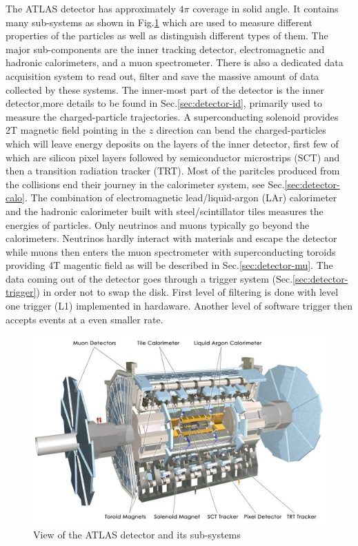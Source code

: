 The ATLAS detector has approximately $4\pi$ coverage in solid angle. It contains many sub-systems as shown in Fig.\ref{fig:detector-atlas} which are used to measure different properties of the particles as well as distinguish different types of them. The major sub-components are the inner tracking detector, electromagnetic and hadronic calorimeters, and a muon spectrometer. There is also a dedicated data acquisition system to read out, filter and save the massive amount of data collected by these systems. The inner-most part of the detector is the inner detector,more details to be found in Sec.\ref{sec:detector-id}, primarily used to measure the charged-particle trajectories. A superconducting solenoid provides 2T magnetic field pointing in the $z$ direction can bend the charged-particles which will leave energy deposits on the layers of the inner detector, first few of which are silicon pixel layers followed by semiconductor microstrips (SCT) and then a transition radiation tracker (TRT). Most of the paritcles produced from the collisions end their journey in the calorimeter system, see Sec.\ref{sec:detector-calo}. The combination of electromagnetic lead/liquid-argon (LAr) calorimeter and the hadronic calorimeter built with steel/scintillator tiles measures the energies of particles. Only neutrinos and muons typically go beyond the calorimeters. Neutrinos hardly interact with materials and escape the detector while muons then enters the muon spectrometer with superconducting toroids providing 4T magentic field as will be described in Sec.\ref{sec:detector-mu}. The data coming out of the detector goes through a trigger system (Sec.\ref{sec:detector-trigger}) in order not to swap the disk. First level of filtering is done with level one trigger (L1) implemented in hardaware. Another level of software trigger then accepts events at a even smaller rate. 


\begin{figure}[htpb!]
\begin{center}
  \includegraphics[width=0.85\linewidth]{figures/detector/ATLAS_Silver_White_MK}
\caption{View of the ATLAS detector and its sub-systems}
\label{fig:detector-atlas}
\end{center}
\end{figure}


